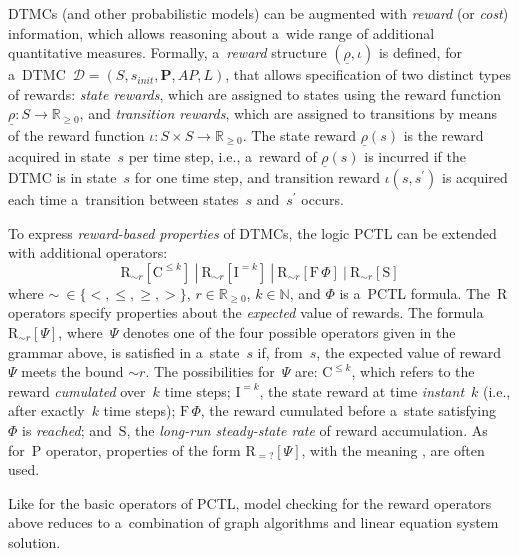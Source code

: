 \documentclass[a4paper, 11pt]{article}
\theoremstyle{definition}
\begin{document}
DTMCs (and other probabilistic models) can be augmented with \emph{reward}
(or \emph{cost}) information, which allows reasoning about a~wide range of
additional quantitative measures. Formally, a~\emph{reward} structure
$ (\underline{\rho}, \iota) $ is defined, for a~DTMC~$ \mathcal{D} = (S,
s_{init}, \boldsymbol{P}, AP, L) $, that allows specification of two distinct
types of rewards: \emph{state rewards}, which are assigned to states using
the reward function $ \underline{\rho} : S \rightarrow \mathbb{R}_{\geq
0} $, and \emph{transition rewards}, which are assigned to transitions by means
of the reward function $ \iota : S \times S \rightarrow \mathbb{R}_{\geq 0} $.
The state reward $ \underline{\rho}(s) $ is the reward acquired in
state~$ s $ per time step, i.e., a~reward of $ \underline{\rho}(s) $ is
incurred if the DTMC is in state~$ s $ for one time step, and transition
reward $ \iota(s, s^\prime) $ is acquired each time a~transition between
states~$ s $ and~$ s^\prime $ occurs.

To express \emph{reward-based properties} of DTMCs, the logic PCTL can be
extended with additional operators:
$$
    \mathrm{R}_{\sim r} [\mathrm{C}^{\leq k}]\ |\
    \mathrm{R}_{\sim r} [\mathrm{I}^{= k}]\ |\
    \mathrm{R}_{\sim r} [\mathrm{F}\,\Phi]\ |\
    \mathrm{R}_{\sim r} [\mathrm{S}]
$$
where $ \sim\ \in \{<, \leq, \geq, >\} $, $ r \in \mathbb{R}_{\geq 0} $,
$ k \in \mathbb{N} $, and $ \Phi $ is a~PCTL formula. The~$ \mathrm{R} $
operators specify properties about the \emph{expected} value of rewards. The
formula $ \mathrm{R}_{\sim r} [\Psi] $, where~$ \Psi $ denotes one of the
four possible operators given in the grammar above, is satisfied in
a~state~$ s $ if, from~$ s $, the expected value of reward~$ \Psi $ meets
the bound $ \sim\!r $. The possibilities for~$ \Psi $ are:
$ \mathrm{C}^{\leq k} $, which refers to the reward \emph{cumulated}
over~$ k $ time steps; $ \mathrm{I}^{= k} $, the state reward at time
\emph{instant}~$ k $ (i.e., after exactly~$ k $ time steps);
$ \mathrm{F}\,\Phi $, the reward cumulated before a~state
satisfying~$ \Phi $ is \emph{reached}; and~$ \mathrm{S} $, the
\emph{long-run steady-state rate} of reward accumulation. As
for~$ \mathrm{P} $ operator, properties of the form $ \mathrm{R}_{= ?}
[\Psi] $, with the meaning \say{what is the expected reward?}, are often
used.

Like for the basic operators of PCTL, model checking for the reward operators
above reduces to a~combination of graph algorithms and linear equation
system solution.
\end{document}
